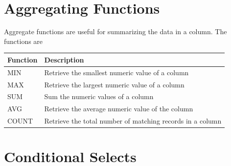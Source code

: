 \section*{Aggregating Functions}
Aggregate functions are useful for summarizing the data in a column.
The functions are
\begin{table}
\begin{tabular}{|l|l|}
\hline
Function & Description \\
\hline
MIN & Retrieve the smallest numeric value of a column \\
MAX & Retrieve the largest numeric value of a column \\
SUM & Sum the numeric values of a column \\
AVG & Retrieve the average numeric value of the column \\
COUNT & Retrieve the total number of matching records in a column\\
\hline
\end{tabular}
\end{table}

\section*{Conditional Selects}


\let\undefined\lsql 